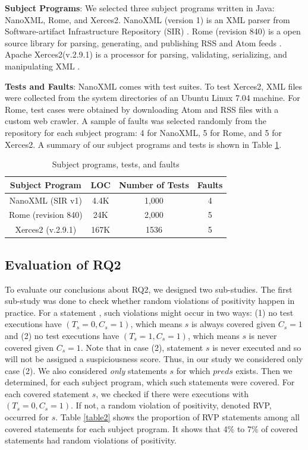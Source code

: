 {\bf Subject Programs}: We selected three subject programs written in Java: NanoXML, Rome, and Xerces2.  NanoXML \cite{Nanoxml} (version 1) is an XML parser from Software-artifact Infrastructure Repository (SIR) \cite{SIR}.  Rome (revision 840) is a open source library for parsing, generating, and publishing RSS and Atom feeds \cite{Rome}.  Apache Xerces2(v.2.9.1) is a processor for parsing, validating, serializing, and manipulating XML \cite{Xerces2}.  

{\bf Tests and Faults}: NanoXML comes with test suites.  To test Xerces2, XML files were collected from the system directories of an Ubuntu Linux 7.04 machine.  For Rome, test cases were obtained by downloading Atom and RSS files with a custom web crawler.  A sample of faults was selected randomly from the repository for each subject program: 4 for NanoXML, 5 for Rome, and 5 for Xerces2.  A summary of our subject programs and tests is shown in Table \ref{table1}.  

\begin{table}
\caption{Subject programs, tests, and faults}\label{table1}
\centering
\begin{tabular}{|c|c|c|c|}
\hline
Subject Program	&	LOC	&	Number of Tests	&	Faults	\\ \hline
NanoXML (SIR v1)	&	4.4K	&	1,000	&	4	\\ \hline
Rome (revision 840)	&	24K	&	2,000	&	5	\\ \hline
Xerces2 (v.2.9.1)	&	167K	&	1536	&	5	\\ \hline

\end{tabular}
\end{table}


\subsection{Evaluation of RQ2}\label{sec4.2}

To evaluate our conclusions about RQ2, we designed two sub-studies. The first sub-study was done to check whether random violations of positivity happen in practice. For a statement , such violations might occur in two ways: (1) no test executions have $(T_s=0,C_s=1)$, which means $s$ is always covered given $C_s=1$ and (2) no test executions have $(T_s=1,C_s=1)$, which means $s$ is never covered given $C_s=1$.  Note that in case (2), statement $s$ is never executed and so will not be assigned a suspiciousness score.  Thus, in our study we considered only case (2).  We also considered {\it only} statements $s$ for which $pred{s}$ exists.  Then we determined, for each subject program, which such statements were covered.  For each covered statement $s$, we checked if there were executions with $(T_s=0,C_s=1)$.  If not, a random violation of positivity, denoted RVP, occurred for $s$.  Table \ref{table2} shows the proportion of RVP statements among all covered statements for each subject program.  It shows that 4\% to 7\% of covered statements had random violations of positivity.

